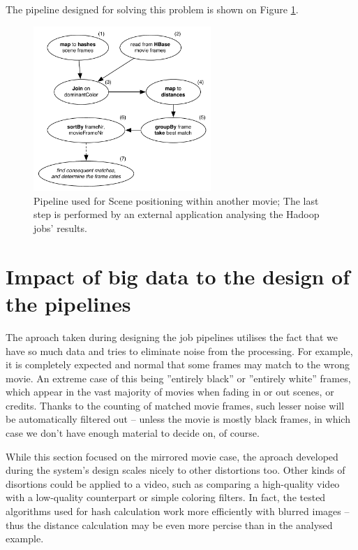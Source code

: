 The pipeline designed for solving this problem is shown on Figure \ref{fig:job-scene}.


\begin{figure}[ch!]
  \centering
  \includegraphics[width=0.6\textwidth]{img/top-match-job-positioning}
  \caption{Pipeline used for Scene positioning within another movie; The last step is performed by an external application analysing the Hadoop jobs' results.}
  \label{fig:job-scene}
\end{figure}






\section{Impact of big data to the design of the pipelines}
\label{sec:summing-up-analysis}

The aproach taken during designing the job pipelines utilises the fact that we have so much data and tries to eliminate noise from the processing. For example, it is completely expected and normal that some frames may match to the wrong movie. An extreme case of this being ''entirely black'' or ''entirely white'' frames, which appear in the vast majority of movies when fading in or out scenes, or credits. Thanks to the counting of matched movie frames, such lesser noise will be automatically filtered out -- unless the movie is mostly black frames, in which case we don't have enough material to decide on, of course.

While this section focused on the mirrored movie case, the aproach developed during the system's design scales nicely to other distortions too. Other kinds of disortions could be applied to a video, such as comparing a high-quality video with a low-quality counterpart or simple coloring filters. In fact, the tested algorithms used for hash calculation work more efficiently with blurred images -- thus the distance calculation may be even more percise than in the analysed example.

